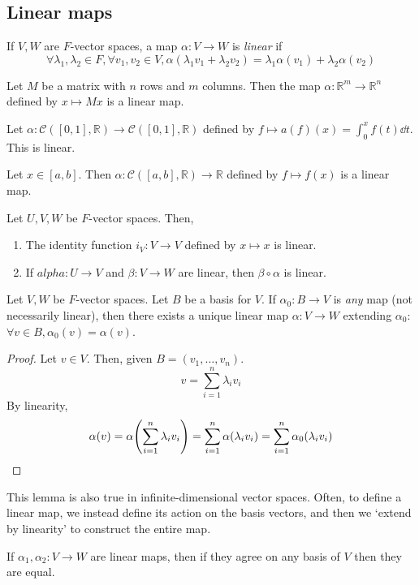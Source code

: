 \subsection{Linear maps}
\begin{definition}
	If \( V, W \) are \( F \)-vector spaces, a map \( \alpha \colon V \to W \) is \textit{linear} if
	\[
		\forall \lambda_1, \lambda_2 \in F, \forall v_1, v_2 \in V, \alpha(\lambda_1 v_1 + \lambda_2 v_2) = \lambda_1 \alpha(v_1) + \lambda_2 \alpha(v_2)
	\]
\end{definition}
\begin{example}
	Let \( M \) be a matrix with \( n \) rows and \( m \) columns.
	Then the map \( \alpha \colon \mathbb R^m \to \mathbb R^n \) defined by \( x \mapsto M x \) is a linear map.
\end{example}
\begin{example}
	Let \( \alpha \colon \mathcal C([0,1], \mathbb R) \to \mathcal C([0,1], \mathbb R) \) defined by \( f \mapsto a(f)(x) = \int_0^x f(t) \dd{t} \).
	This is linear.
\end{example}
\begin{example}
	Let \( x \in [a,b] \).
	Then \( \alpha \colon \mathcal C([a,b], \mathbb R) \to \mathbb R \) defined by \( f \mapsto f(x) \) is a linear map.
\end{example}
\begin{remark}
	Let \( U, V, W \) be \( F \)-vector spaces.
	Then,
	\begin{enumerate}
		\item The identity function \( i_V \colon V \to V \) defined by \( x \mapsto x \) is linear.
		\item If \( alpha \colon U \to V \) and \( \beta \colon V \to W \) are linear, then \( \beta \circ \alpha \) is linear.
	\end{enumerate}
\end{remark}
\begin{lemma}
	Let \( V, W \) be \( F \)-vector spaces.
	Let \( B \) be a basis for \( V \).
	If \( \alpha_0 \colon B \to V \) is \textit{any} map (not necessarily linear), then there exists a unique linear map \( \alpha \colon V \to W \) extending \( \alpha_0 \): \( \forall v \in B, \alpha_0(v) = \alpha(v) \).
\end{lemma}
\begin{proof}
	Let \( v \in V \).
	Then, given \( B = (v_1, \dots, v_n) \).
	\[
		v = \sum_{i=1}^n \lambda_i v_i
	\]
	By linearity,
	\[
		\alpha(v) = \alpha\qty(\sum_{i=1}^n \lambda_i v_i) = \sum_{i=1}^n \alpha(\lambda_i v_i) = \sum_{i=1}^n \alpha_0(\lambda_i v_i)
	\]
\end{proof}
\begin{remark}
	This lemma is also true in infinite-dimensional vector spaces.
	Often, to define a linear map, we instead define its action on the basis vectors, and then we `extend by linearity' to construct the entire map.
\end{remark}
\begin{remark}
	If \( \alpha_1, \alpha_2 \colon V \to W \) are linear maps, then if they agree on any basis of \( V \) then they are equal.
\end{remark}

